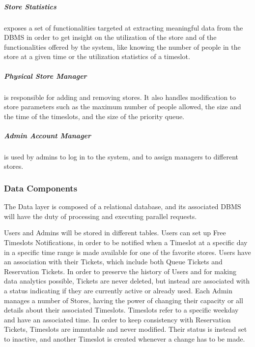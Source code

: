 \subparagraph{Store Statistics} exposes a set of functionalities targeted at extracting meaningful data from the DBMS in order to get insight on the utilization of the store and of the functionalities offered by the system, like knowing the number of people in the store at a given time or the utilization statistics of a timeslot.

\subparagraph{Physical Store Manager} is responsible for adding and removing stores. It also handles modification to store parameters such as the maximum number of people allowed, the size and the time of the timeslots, and the size of the priority queue.

\subparagraph{Admin Account Manager} is used by admins to log in to the system, and to assign managers to different stores.

\subsubsection{Data Components}
The Data layer is composed of a relational database, and its associated DBMS will have the duty of processing and executing parallel requests.

Users and Admins will be stored in different tables.
Users can set up Free Timeslots Notifications, in order to be notified when a Timeslot at a specific day in a specific time range is made available for one of the favorite stores.
Users have an association with their Tickets, which include both Queue Tickets and Reservation Tickets.
In order to preserve the history of Users and for making data analytics possible, Tickets are never deleted, but instead are associated with a status indicating if they are currently active or already used.
Each Admin manages a number of Stores, having the power of changing their capacity or all details about their associated Timeslots.
Timeslots refer to a specific weekday and have an associated time.
In order to keep consistency with Reservation Tickets, Timeslots are immutable and never modified. Their status is instead set to inactive, and another Timeslot is created whenever a change has to be made.


